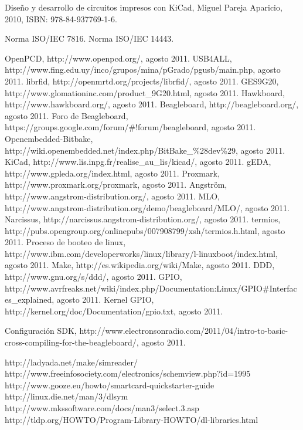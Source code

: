\begin{thebibliography}{200}
 Diseño y desarrollo de circuitos impresos con KiCad, Miguel Pareja Aparicio, 2010, ISBN: 978-84-937769-1-6.


 Norma ISO/IEC 7816.
 Norma ISO/IEC 14443.



 OpenPCD, http://www.openpcd.org/, agosto 2011.
 USB4ALL, http://www.fing.edu.uy/inco/grupos/mina/pGrado/pgusb/main.php, agosto 2011.
 librfid, http://openmrtd.org/projects/librfid/, agosto 2011.
 GES9G20, http://www.glomationinc.com/product\_9G20.html, agosto 2011.
 Hawkboard, http://www.hawkboard.org/, agosto 2011.
 Beagleboard, http://beagleboard.org/, agosto 2011.
 Foro de Beagleboard, https://groups.google.com/forum/\#!forum/beagleboard, agosto 2011.
 Openembedded-Bitbake, http://wiki.openembedded.net/index.php/BitBake\_\%28dev\%29, agosto 2011.
 KiCad, http://www.lis.inpg.fr/realise\_au\_lis/kicad/, agosto 2011.
 gEDA, http://www.gpleda.org/index.html, agosto 2011.
 Proxmark, http://www.proxmark.org/proxmark, agosto 2011.
 Angström, http://www.angstrom-distribution.org/, agosto 2011.
 MLO, http://www.angstrom-distribution.org/demo/beagleboard/MLO/, agosto 2011.
 Narcissus, http://narcissus.angstrom-distribution.org/, agosto 2011.
 termios, http://pubs.opengroup.org/onlinepubs/007908799/xsh/termios.h.html, agosto 2011.
 Proceso de booteo de linux, http://www.ibm.com/developerworks/linux/library/l-linuxboot/index.html, agosto 2011.
 Make, http://es.wikipedia.org/wiki/Make, agosto 2011.
 DDD, http://www.gnu.org/s/ddd/, agosto 2011.
 GPIO, http://www.avrfreaks.net/wiki/index.php/Documentation:Linux/GPIO\#Interfaces\_explained, agosto 2011.
 Kernel GPIO, http://kernel.org/doc/Documentation/gpio.txt, agosto 2011.

 Configuración SDK, http://www.electronsonradio.com/2011/04/intro-to-basic-cross-compiling-for-the-beagleboard/, agosto 2011.


\bibitem{} http://ladyada.net/make/simreader/
\bibitem{} http://www.freeinfosociety.com/electronics/schemview.php?id=1995
\bibitem{} http://www.gooze.eu/howto/smartcard-quickstarter-guide
\bibitem{} http://linux.die.net/man/3/dlsym
\bibitem{} http://www.mkssoftware.com/docs/man3/select.3.asp
\bibitem{} http://tldp.org/HOWTO/Program-Library-HOWTO/dl-libraries.html


\end{thebibliography}
